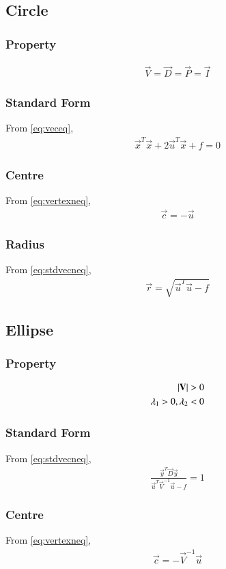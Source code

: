 \documentclass[journal,12pt,twocolumn]{IEEEtran}
\begin{document}
\subsection{Circle}
\subsubsection{Property}
\begin{align}
    \vec{V}=\vec{D}=\vec{P}=\vec{I}
\end{align}
\subsubsection{Standard Form}
From \eqref{eq:veceq},
\begin{align}
    \vec{x}^T\vec{x}+2\vec{u}^T\vec{x} + f =0
\end{align}
\subsubsection{Centre}
From \eqref{eq:vertexneq},
\begin{align}
    \vec{c} = -\vec{u}
\end{align}
\subsubsection{Radius}
From \eqref{eq:stdvecneq},
\begin{align}
    \vec{r} = \sqrt{\vec{u}^T\vec{u} - f}
\end{align}
\subsection{Ellipse}
\subsubsection{Property}
\begin{align}
    \left\vert\mathbf{V}\right\vert > 0
    \\
    \lambda_1>0,\lambda_2<0
\end{align}
\subsubsection{Standard Form}
From \eqref{eq:stdvecneq},
\begin{align}
    \frac{\vec{y}^T\vec{D}\vec{y}}{\vec{u}^T\vec{V}^{-1}\vec{u}-f}=1
\end{align}
\subsubsection{Centre}
From \eqref{eq:vertexneq},
\begin{align}
    \vec{c} = -\vec{V}^{-1}\vec{u}
\end{align}
\end{document}

